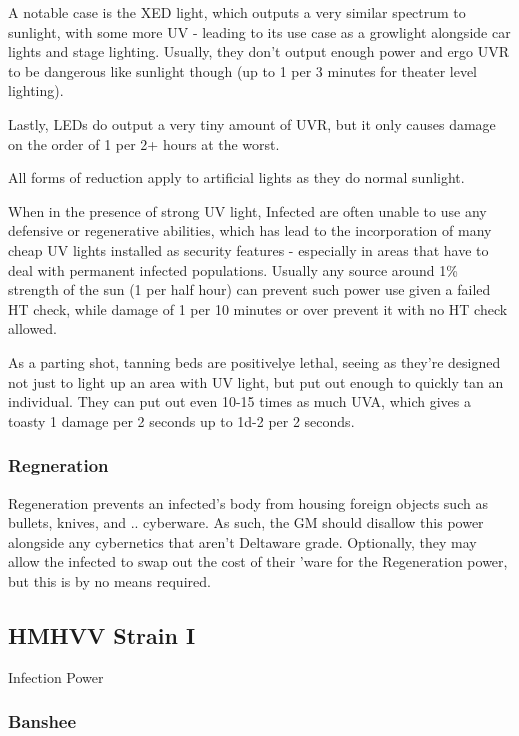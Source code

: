 \begin{multicols*}{3}
	A notable case is the XED light, which outputs a very similar spectrum to sunlight, with some more UV - leading to its use case as a growlight alongside car lights and stage lighting. Usually, they don't output enough power and ergo UVR to be dangerous like sunlight though (up to 1 per 3 minutes for theater level lighting).
	
	Lastly, LEDs do output a very tiny amount of UVR, but it only causes damage on the order of 1 per 2+ hours at the worst.
	
	All forms of reduction apply to artificial lights as they do normal sunlight.
	
	When in the presence of strong UV light, Infected are often unable to use any defensive or regenerative abilities, which has lead to the incorporation of many cheap UV lights installed as security features - especially in areas that have to deal with permanent infected populations. Usually any source around 1\% strength of the sun (1 per half hour) can prevent such power use given a failed HT check, while damage of 1 per 10 minutes or over prevent it with no HT check allowed.
	
	As a parting shot, tanning beds are positivelye lethal, seeing as they're designed not just to light up an area with UV light, but put out enough to quickly tan an individual. They can put out even 10-15 times as much UVA, which gives a toasty 1 damage per 2 seconds up to 1d-2 per 2 seconds.
	
	\subsubsection{Regneration}
	
	Regeneration prevents an infected's body from housing foreign objects such as bullets, knives, and .. cyberware. As such, the GM should disallow this power alongside any cybernetics that aren't Deltaware grade. Optionally, they may allow the infected to swap out the cost of their 'ware for the Regeneration power, but this is by no means required.
	
	
	\subsection*{HMHVV Strain I}
	
	Infection Power
	
	\subsubsection{Banshee}
	

\end{multicols*}
